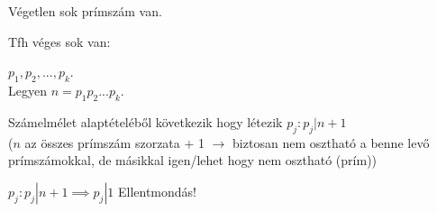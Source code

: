 \begin{frame}
  \begin{tcolorbox}[title={Tétel: Eukleidész tétele}]
    Végetlen sok prímszám van.
  \tcblower
    \mmedskip
    
    Tfh véges sok van:\\
    \msmallskip
    
    $p_1, p_2, ... ,p_k$.\\
    Legyen $n = p_1p_2...p_k$.\\
    \msmallskip
    
    Számelmélet alaptételéből következik hogy létezik $p_j : p_j | n + 1$\\
    ($n$ az összes prímszám szorzata + 1 $\rightarrow$ biztosan nem osztható a benne levő prímszámokkal, de másikkal igen/lehet hogy nem osztható (prím))\\
    \msmallskip
    
    $p_j : p_j | n + 1 \implies p_j | 1$ Ellentmondás!
  \end{tcolorbox}
\end{frame}

